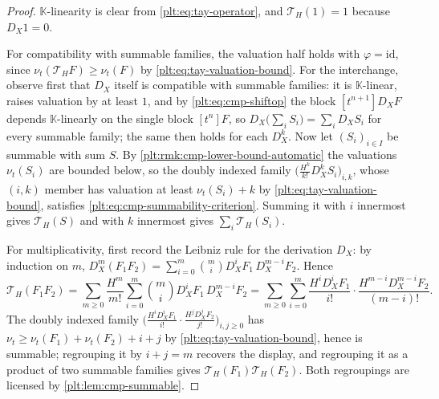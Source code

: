 \documentclass[11pt,oneside]{article}
\theoremstyle{plain}
\theoremstyle{definition}
\theoremstyle{remark}
\newcommand{\K}{\mathbb{K}}
\newcommand{\ordt}{\nu_{t}}                              %
\newcommand{\DX}{D_{X}}                                  %
\begin{document}
\begin{proof}
\(\K\)-linearity is clear from \eqref{plt:eq:tay-operator}, and
\(\mathcal T_{H}(1)=1\) because \(\DX1=0\).

For compatibility with summable families, the valuation half holds with
\(\varphi=\mathrm{id}\), since
\(\ordt(\mathcal T_{H}F)\ge\ordt(F)\) by
\eqref{plt:eq:tay-valuation-bound}.  For the interchange, observe first that
\(\DX\) itself is compatible with summable families: it is \(\K\)-linear,
raises valuation by at least \(1\), and by \eqref{plt:eq:cmp-shiftop} the
block \([t^{n+1}]\DX F\) depends \(\K\)-linearly on the single block
\([t^{n}]F\), so \(\DX\bigl(\sum_iS_i\bigr)=\sum_i\DX S_i\) for every
summable family; the same then holds for each \(\DX^{k}\).  Now let
\((S_i)_{i\in I}\) be summable with sum \(S\).  By
\cref{plt:rmk:cmp-lower-bound-automatic} the valuations \(\ordt(S_i)\) are
bounded below, so the doubly indexed family
\(\bigl(\tfrac{H^{k}}{k!}\DX^{k}S_i\bigr)_{i,k}\), whose \((i,k)\) member has
valuation at least \(\ordt(S_i)+k\) by
\eqref{plt:eq:tay-valuation-bound}, satisfies
\eqref{plt:eq:cmp-summability-criterion}.  Summing it with \(i\) innermost
gives \(\mathcal T_{H}(S)\) and with \(k\) innermost gives
\(\sum_i\mathcal T_{H}(S_i)\).

For multiplicativity, first record the Leibniz rule for the derivation
\(\DX\): by induction on \(m\),
\(\DX^{m}(F_1F_2)=\sum_{i=0}^{m}\binom{m}{i}\DX^{i}F_1\,\DX^{m-i}F_2\).
Hence
\[
 \mathcal T_{H}(F_1F_2)
 =\sum_{m\ge0}\frac{H^{m}}{m!}
   \sum_{i=0}^{m}\binom{m}{i}\DX^{i}F_1\,\DX^{m-i}F_2
 =\sum_{m\ge0}\sum_{i=0}^{m}
   \frac{H^{i}\DX^{i}F_1}{i!}\cdot
   \frac{H^{m-i}\DX^{m-i}F_2}{(m-i)!} .
\]
The doubly indexed family
\(\bigl(\tfrac{H^{i}\DX^{i}F_1}{i!}\cdot
 \tfrac{H^{j}\DX^{j}F_2}{j!}\bigr)_{i,j\ge0}\)
has \(\ordt\ge\ordt(F_1)+\ordt(F_2)+i+j\) by
\eqref{plt:eq:tay-valuation-bound}, hence is summable; regrouping it by
\(i+j=m\) recovers the display, and regrouping it as a product of two
summable families gives \(\mathcal T_{H}(F_1)\mathcal T_{H}(F_2)\).  Both
regroupings are licensed by \cref{plt:lem:cmp-summable}.
\end{proof}
\end{document}
